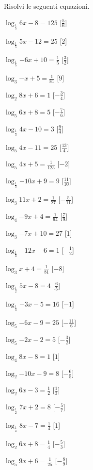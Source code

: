 \begin{esercizio}\label{ese:}
 Risolvi le seguenti equazioni.
\begin{multicols}{2}
 \begin{enumeratea}
  \item  \(\log_{\frac{1}{5}}{6 x -8} = 125\)
   \hfill [\( \frac{5}{6} \)]
  \item  \(\log_{\frac{1}{5}}{5 x -12} = 25\)
   \hfill [\( 2 \)]
  \item  \(\log_{\frac{1}{5}}{-6 x +10} = \frac{1}{5}\)
   \hfill [\( \frac{3}{2} \)]
  \item  \(\log_{3}{- x +5} = \frac{1}{81}\)
   \hfill [\( 9 \)]
  \item  \(\log_{2}{8 x +6} = 1\)
   \hfill [\( -\frac{3}{4} \)]
  \item  \(\log_{5}{6 x +8} = 5\)
   \hfill [\( -\frac{7}{6} \)]
  \item  \(\log_{\frac{1}{3}}{4 x -10} = 3\)
   \hfill [\( \frac{9}{4} \)]
  \item  \(\log_{5}{4 x -11} = 25\)
   \hfill [\( \frac{13}{4} \)]
  \item  \(\log_{5}{4 x +5} = \frac{1}{125}\)
   \hfill [\( -2 \)]
  \item  \(\log_{\frac{1}{3}}{-10 x +9} = 9\)
   \hfill [\( \frac{11}{10} \)]
  \item  \(\log_{3}{11 x +2} = \frac{1}{27}\)
   \hfill [\( -\frac{5}{11} \)]
  \item  \(\log_{4}{-9 x +4} = \frac{1}{64}\)
   \hfill [\( \frac{7}{9} \)]
  \item  \(\log_{3}{-7 x +10} = 27\)
   \hfill [\( 1 \)]
  \item  \(\log_{\frac{1}{4}}{-12 x -6} = 1\)
   \hfill [\( -\frac{1}{2} \)]
  \item  \(\log_{3}{x +4} = \frac{1}{81}\)
   \hfill [\( -8 \)]
  \item  \(\log_{\frac{1}{2}}{5 x -8} = 4\)
   \hfill [\( \frac{6}{5} \)]
  \item  \(\log_{\frac{1}{4}}{-3 x -5} = 16\)
   \hfill [\( -1 \)]
  \item  \(\log_{5}{-6 x -9} = 25\)
   \hfill [\( -\frac{11}{6} \)]
  \item  \(\log_{5}{-2 x -2} = 5\)
   \hfill [\( -\frac{3}{2} \)]
  \item  \(\log_{4}{8 x -8} = 1\)
   \hfill [\( 1 \)]
  \item  \(\log_{2}{-10 x -9} = 8\)
   \hfill [\( -\frac{6}{5} \)]
  \item  \(\log_{2}{6 x -3} = \frac{1}{2}\)
   \hfill [\( \frac{1}{3} \)]
  \item  \(\log_{\frac{1}{2}}{7 x +2} = 8\)
   \hfill [\( -\frac{5}{7} \)]
  \item  \(\log_{\frac{1}{4}}{8 x -7} = \frac{1}{4}\)
   \hfill [\( 1 \)]
  \item  \(\log_{2}{6 x +8} = \frac{1}{4}\)
   \hfill [\( -\frac{5}{3} \)]
  \item  \(\log_{5}{9 x +6} = \frac{1}{25}\)
   \hfill [\( -\frac{8}{9} \)]
 \end{enumeratea}
\end{multicols}
\end{esercizio}





